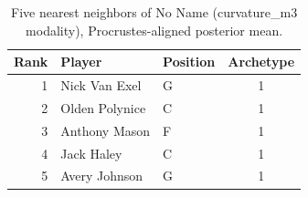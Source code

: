 \begin{table}[htbp]
  \centering\small
  \begin{tabular}{rllc}
    \toprule
    Rank & Player & Position & Archetype \\
    \midrule
    1 & Nick Van Exel & G & 1 \\
    2 & Olden Polynice & C & 1 \\
    3 & Anthony Mason & F & 1 \\
    4 & Jack Haley & C & 1 \\
    5 & Avery Johnson & G & 1 \\
    \bottomrule
  \end{tabular}
  \caption{Five nearest neighbors of No Name (curvature_m3 modality), Procrustes-aligned posterior mean.}
  \label{tab:No_Name_neighbors_curvature_m3}
\end{table}

